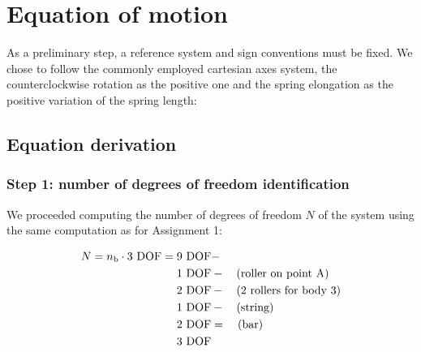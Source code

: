 \documentclass[a4paper,12pt,oneside]{article}
\begin{document}
\clearpage

\section{Equation of motion}

As a preliminary step, a reference system and sign conventions must be fixed. We chose to follow the commonly employed cartesian axes system, the counterclockwise rotation as the positive one and the spring elongation as the positive variation of the spring length:

\begin{figure}[H]
	\centering
	\hspace{50pt}
\end{figure}

\subsection{Equation derivation}

\subsubsection*{Step 1: number of degrees of freedom identification}

We proceeded computing the number of degrees of freedom $ N $ of the system using the same computation as for Assignment 1:

\[ \begin{split}
	N = n_\textup{b} \cdot 3 ~ \text{DOF} = 9 ~ \text{DOF} & - \\
	1 ~ \text{DOF} & - \quad \text{(roller on point A)} \\
	2 ~ \text{DOF}  & - \quad \text{(2 rollers for body 3)} \\
	1 ~ \text{DOF} & - \quad \text{(string)} \\
	2 ~ \text{DOF} & = \quad \text{(bar)} \\
	3 ~ \text{DOF}
\end{split} \]
\end{document}
